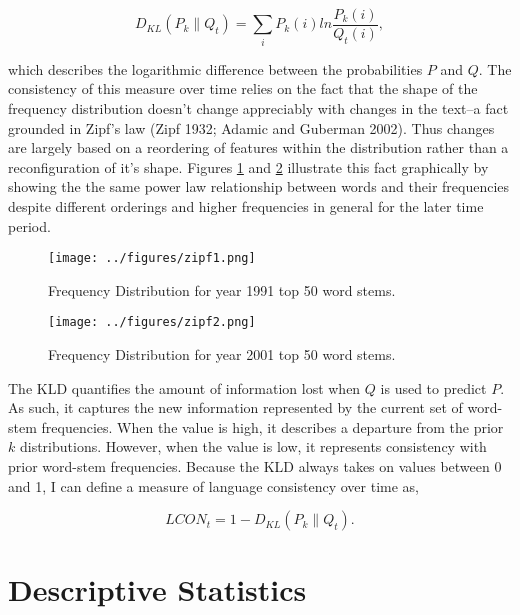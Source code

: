 \begin{equation}
	D_{KL}(P_k\|Q_t) = \sum_i{P_k(i)ln\frac{P_k(i)}{Q_t(i)}},
\end{equation}

\noindent which describes the logarithmic difference between the probabilities $P$ and $Q$. The consistency of this measure over time relies on the fact that the shape of the frequency distribution doesn't change appreciably with changes in the text--a fact grounded in Zipf's law (Zipf 1932; Adamic and Guberman 2002). Thus changes are largely based on a reordering of features within the distribution rather than a reconfiguration of it's shape. Figures \ref{zipf1} and \ref{zipf2} illustrate this fact graphically by showing the the same power law relationship between words and their frequencies despite different orderings and higher frequencies in general for the later time period.

\begin{figure}
\begin{center}
\texttt{[image: ../figures/zipf1.png]}
\caption[Frequency Distribution 1991]{Frequency Distribution for year 1991 top 50 word stems. \label{zipf1}}
\end{center}
\end{figure}

\begin{figure}
\begin{center}
\texttt{[image: ../figures/zipf2.png]}
\caption[Frequency Distribution 2001]{Frequency Distribution for year 2001 top 50 word stems. \label{zipf2}}
\end{center}
\end{figure}

The KLD quantifies the amount of information lost when $Q$ is used to predict $P$. As such, it captures the new information represented by the current set of word-stem frequencies. When the value is high, it describes a departure from the prior $k$ distributions. However, when the value is low, it represents consistency with prior word-stem frequencies. Because the KLD always takes on values between 0 and 1, I can define a measure of language consistency over time as,

\begin{equation}
	LCON_t=1-D_{KL}(P_k\|Q_t).
\end{equation}


\section{Descriptive Statistics}

